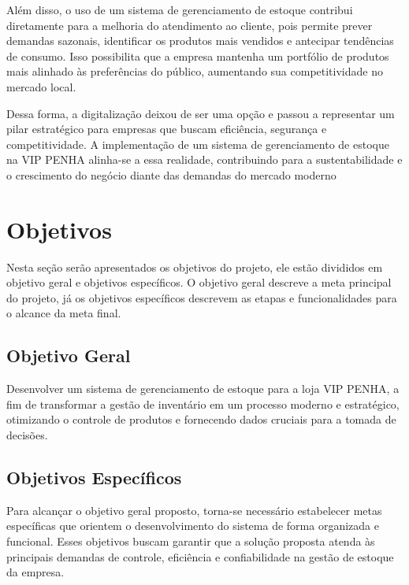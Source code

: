 \documentclass[
	12pt,				%
	openany,			%
	twoside,			%
	a4paper,			%
	english,			%
	brazil				%
	]{abntex2}
\begin{document}
Além disso, o uso de um sistema de gerenciamento de estoque contribui diretamente para a melhoria do atendimento ao cliente, pois permite prever demandas sazonais, identificar os produtos mais vendidos e antecipar tendências de consumo. Isso possibilita que a empresa mantenha um portfólio de produtos mais alinhado às preferências do público, aumentando sua competitividade no mercado local. 

Dessa forma, a digitalização deixou de ser uma opção e passou a representar um pilar estratégico para empresas que buscam eficiência, segurança e competitividade. A implementação de um sistema de gerenciamento de estoque na VIP PENHA alinha-se a essa realidade, contribuindo para a sustentabilidade e o crescimento do negócio diante das demandas do mercado moderno

\section{Objetivos}

Nesta seção serão apresentados os objetivos do projeto, ele estão divididos em objetivo geral e objetivos específicos. O objetivo geral descreve a meta principal do projeto, já os objetivos específicos descrevem as etapas e funcionalidades para o alcance da meta final.

\subsection{Objetivo Geral}

Desenvolver um sistema de gerenciamento de estoque para a loja VIP PENHA, a fim de transformar a gestão de inventário em um processo moderno e estratégico, otimizando o controle de produtos e fornecendo dados cruciais para a tomada de decisões.

\subsection{Objetivos Específicos}

Para alcançar o objetivo geral proposto, torna-se necessário estabelecer metas específicas que orientem o desenvolvimento do sistema de forma organizada e funcional. Esses objetivos buscam garantir que a solução proposta atenda às principais demandas de controle, eficiência e confiabilidade na gestão de estoque da empresa.
\end{document}
